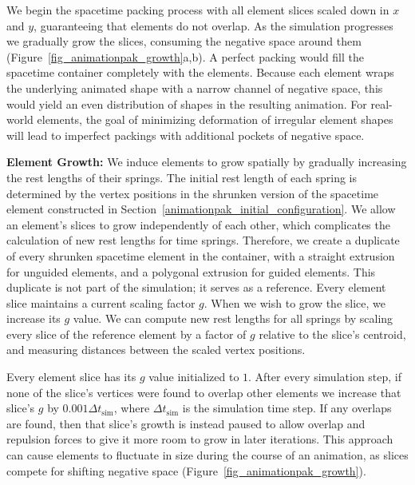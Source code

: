 We begin the spacetime packing process with all element slices scaled
down in $x$ and $y$, guaranteeing that elements do not 
overlap.  As the simulation progresses we gradually grow the slices, 
consuming the negative space around them (Figure~\ref{fig_animationpak_growth}a,b).
A perfect packing would fill the spacetime container completely with the elements.
Because each element wraps the underlying animated shape with a narrow channel
of negative space, this would yield an even
distribution of shapes in the resulting animation.
For real-world elements, the goal of minimizing deformation of irregular 
element shapes will lead to imperfect packings with additional pockets
of negative space.


\textbf{Element Growth:}
We induce elements to grow spatially by gradually increasing the rest 
lengths of their springs.
The initial rest length of each spring is determined by the vertex positions in
the shrunken version of the spacetime element constructed in 
Section~\ref{animationpak_initial_configuration}.
We allow an element's slices to grow independently of each other, which
complicates the calculation of new rest lengths for time springs.
Therefore, we create a duplicate of every shrunken spacetime element
in the container, with a straight extrusion
for unguided elements, and a polygonal extrusion for guided elements.
This duplicate is not part of the simulation; it serves as a reference.
Every element slice maintains a current scaling factor $g$.
When we wish to grow the slice, we increase its $g$ value.
We can compute new rest lengths for all springs by scaling every slice
of the reference element by a factor of $g$ relative to the
slice's centroid, and measuring distances between the scaled vertex
positions.  

Every element slice has its $g$ value initialized to $1$.  After every
simulation step, if none of the slice's vertices were found to 
overlap other elements we increase that slice's $g$ by 
$0.001 \Delta t_\mathrm{sim}$, where $\Delta t_\mathrm{sim}$ is the 
simulation time step.  If any overlaps are found, then that slice's
growth is instead paused to allow overlap and repulsion forces to give it more
room to grow in later iterations.  
This approach can cause elements to fluctuate in size during the course
of an animation, as slices compete for shifting negative space 
(Figure~\ref{fig_animationpak_growth}).

